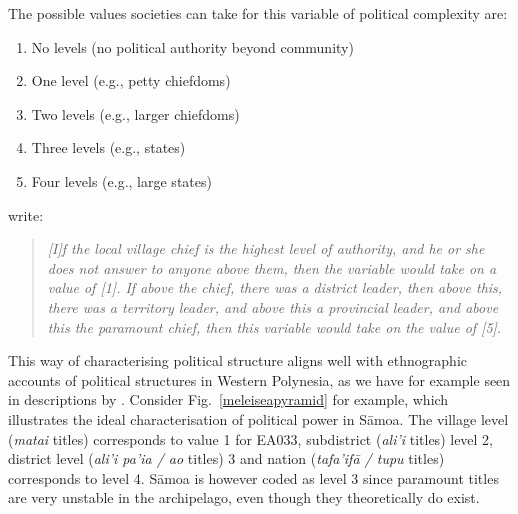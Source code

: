 \documentclass[a4paper,10pt]{article} %
\begin{document}
The possible values societies can take for this variable of political complexity are:

\begin{enumerate}
\item No levels (no political authority beyond community)
\item One level (e.g., petty chiefdoms)
\item Two levels (e.g., larger chiefdoms)
\item Three levels (e.g., states) 
\item Four levels (e.g., large states)
\end{enumerate}

\citet{giuliano2018ancestral} write: 

\begin{quotation}
\noindent\emph{[I]f the local village chief is the highest level of authority, and he or she does not answer to anyone above them, then the variable would take on a value of [1]. If above the chief, there was a district leader, then above this, there was a territory leader, and above this a provincial leader, and above this the paramount chief, then this variable would take on the value of [5].} 
\begin{flushright}
\citet[9]{giuliano2018ancestral}
\end{flushright}
\end{quotation}

This way of characterising political structure aligns well with ethnographic accounts of political structures in Western Polynesia, as we have for example seen in descriptions by \citet{sahlins63}. Consider Fig.~\ref{meleiseapyramid} \citep[22]{meleisea1995} for example, which illustrates the ideal characterisation of political power in S\={a}moa. The village level (\emph{matai} titles) corresponds to value 1 for EA033, subdistrict (\emph{ali'i} titles) level 2, district level (\emph{ali'i pa'ia / ao} titles) 3 and nation (\emph{tafa'if\={a} / tupu} titles) corresponds to level 4. S\={a}moa is however coded as level 3 since paramount titles are very unstable in the archipelago, even though they theoretically do exist.

\end{document}

